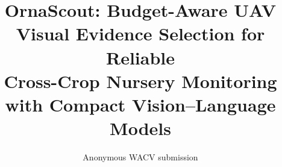 \documentclass[10pt,twocolumn,letterpaper]{article}
\title{OrnaScout: Budget-Aware UAV Visual Evidence Selection for Reliable\\
Cross-Crop Nursery Monitoring with Compact Vision--Language Models}
\author{Anonymous WACV submission}
\begin{document}
\maketitle








\FloatBarrier
{\small


}
\end{document}
